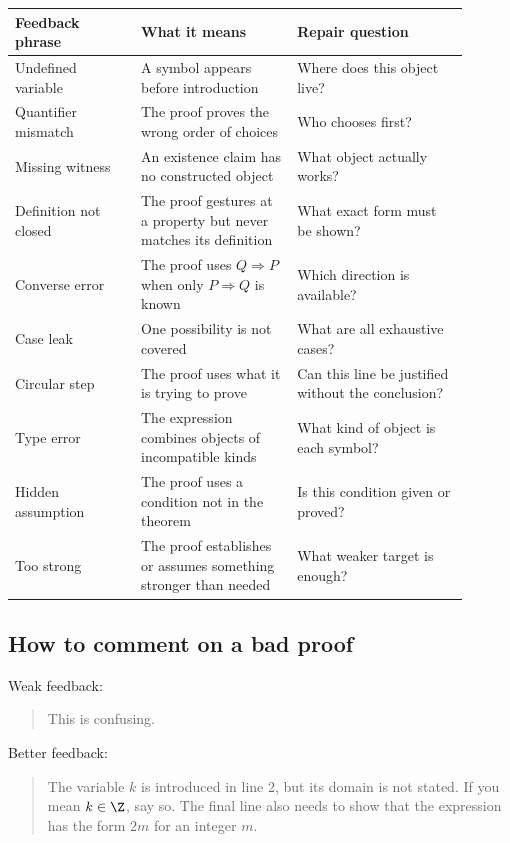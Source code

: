 \begin{longtable}{p{0.25\linewidth}p{0.31\linewidth}p{0.34\linewidth}}
\toprule
Feedback phrase & What it means & Repair question \\
\midrule
Undefined variable & A symbol appears before introduction & Where does this object live? \\
Quantifier mismatch & The proof proves the wrong order of choices & Who chooses first? \\
Missing witness & An existence claim has no constructed object & What object actually works? \\
Definition not closed & The proof gestures at a property but never matches its definition & What exact form must be shown? \\
Converse error & The proof uses $Q\Rightarrow P$ when only $P\Rightarrow Q$ is known & Which direction is available? \\
Case leak & One possibility is not covered & What are all exhaustive cases? \\
Circular step & The proof uses what it is trying to prove & Can this line be justified without the conclusion? \\
Type error & The expression combines objects of incompatible kinds & What kind of object is each symbol? \\
Hidden assumption & The proof uses a condition not in the theorem & Is this condition given or proved? \\
Too strong & The proof establishes or assumes something stronger than needed & What weaker target is enough? \\
\bottomrule
\end{longtable}

\subsection{How to comment on a bad proof}

Weak feedback:

\begin{quote}
This is confusing.
\end{quote}

Better feedback:

\begin{quote}
The variable $k$ is introduced in line 2, but its domain is not stated. If you mean $k\in\Z$, say so. The final line also needs to show that the expression has the form $2m$ for an integer $m$.
\end{quote}

